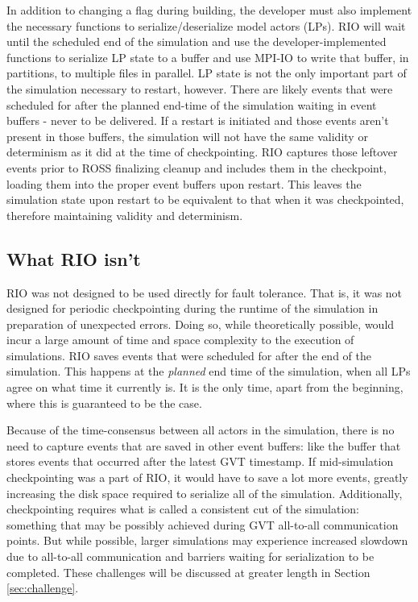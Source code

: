 \documentclass[letterpaper, 11 pt, conference]{IEEEtran}
\begin{document}
In addition to changing a flag during building, the developer must also implement the necessary functions to serialize/deserialize model actors (LPs). RIO will wait until the scheduled end of the simulation and use the developer-implemented functions to serialize LP state to a buffer and use MPI-IO to write that buffer, in partitions, to multiple files in parallel. LP state is not the only important part of the simulation necessary to restart, however. There are likely events that were scheduled for after the planned end-time of the simulation waiting in event buffers - never to be delivered. If a restart is initiated and those events aren't present in those buffers, the simulation will not have the same validity or determinism as it did at the time of checkpointing. RIO captures those leftover events prior to ROSS finalizing cleanup and includes them in the checkpoint, loading them into the proper event buffers upon restart. This leaves the simulation state upon restart to be equivalent to that when it was checkpointed, therefore maintaining validity and determinism. 


\subsection{What RIO isn't}
RIO was not designed to be used directly for fault tolerance. That is, it was not designed for periodic checkpointing during the runtime of the simulation in preparation of unexpected errors. Doing so, while theoretically possible, would incur a large amount of time and space complexity to the execution of simulations. RIO saves events that were scheduled for after the end of the simulation. This happens at the \emph{planned} end time of the simulation, when all LPs agree on what time it currently is. It is the only time, apart from the beginning, where this is guaranteed to be the case. 

Because of the time-consensus between all actors in the simulation, there is no need to capture events that are saved in other event buffers: like the buffer that stores events that occurred after the latest GVT timestamp. If mid-simulation checkpointing was a part of RIO, it would have to save a lot more events, greatly increasing the disk space required to serialize all of the simulation. Additionally, checkpointing requires what is called a consistent cut of the simulation: something that may be possibly achieved during GVT all-to-all communication points. But while possible, larger simulations may experience increased slowdown due to all-to-all communication and barriers waiting for serialization to be completed. These challenges will be discussed at greater length in Section \ref{sec:challenge}.
\end{document}
